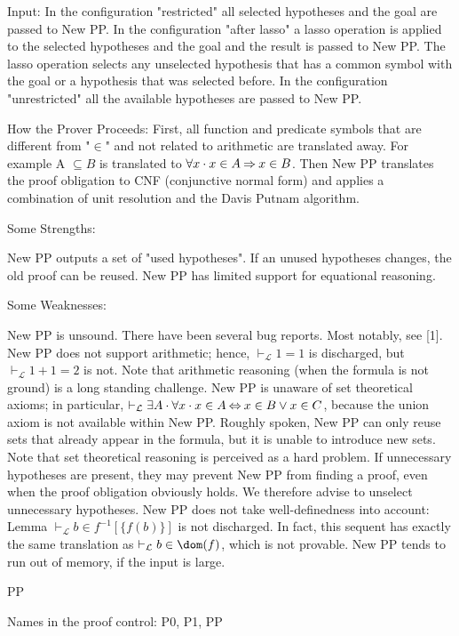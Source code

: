 Input: In the configuration "restricted" all selected hypotheses and the goal are passed to New PP. In the configuration "after lasso" a lasso operation is applied to the selected hypotheses and the goal and the result is passed to New PP. The lasso operation selects any unselected hypothesis that has a common symbol with the goal or a hypothesis that was selected before. In the configuration "unrestricted" all the available hypotheses are passed to New PP.

How the Prover Proceeds: First, all function and predicate symbols that are different from "$\in$" and not related to arithmetic are translated away. For example A $\subseteq B$ is translated to $\forall x\cdot x \in A \mathbin\Rightarrow x \in B$. Then New PP translates the proof obligation to CNF (conjunctive normal form) and applies a combination of unit resolution and the Davis Putnam algorithm.

Some Strengths:

    New PP outputs a set of "used hypotheses". If an unused hypotheses changes, the old proof can be reused.
    New PP has limited support for equational reasoning. 

Some Weaknesses:

    New PP is unsound. There have been several bug reports. Most notably, see [1].
    New PP does not support arithmetic; hence, $\vdash_{\mathcal L} 1=1$ is discharged, but $\vdash_{\mathcal L} 1+1=2$ is not. Note that arithmetic reasoning (when the formula is not ground) is a long standing challenge.
    New PP is unaware of set theoretical axioms; in particular, $\vdash_{\mathcal L} \exists A\cdot \forall x\cdot x \in A \mathbin\Leftrightarrow x \in B \lor x \in C$, because the union axiom is not available within New PP. Roughly spoken, New PP can only reuse sets that already appear in the formula, but it is unable to introduce new sets. Note that set theoretical reasoning is perceived as a hard problem.
    If unnecessary hypotheses are present, they may prevent New PP from finding a proof, even when the proof obligation obviously holds. We therefore advise to unselect unnecessary hypotheses.
    New PP does not take well-definedness into account:
        Lemma $\vdash_{\mathcal L} b \in f^{-1} [\{f(b)\}]$ is not discharged. In fact, this sequent has exactly the same translation as $\vdash_{\mathcal L} b \in\dom(f)$, which is not provable. 
    New PP tends to run out of memory, if the input is large. 

PP

Names in the proof control: P0, P1, PP

